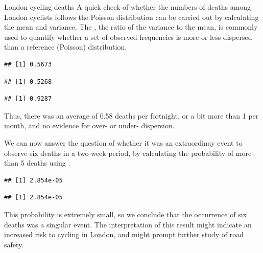 \documentclass[11pt]{book}
\renewenvironment{knitrout}{\small\renewcommand{\baselinestretch}{.85}}{} %
\begin{document}
\begin{Example}[cyclists2]{London cycling deaths}
A quick check of whether the numbers of deaths among London cyclists
follows the Poisson distribution
can be carried out by calculating the mean and variance.
The , the ratio of the variance to the mean,
is commonly used to quantify whether a set of observed frequencies 
is more or less dispersed than a reference (Poisson) distribution.
\begin{knitrout}
\color{fgcolor}\begin{kframe}
\begin{alltt}
 \hlkwb{<-} \hlopt{$}
\end{alltt}
\begin{verbatim}
## [1] 0.5673
\end{verbatim}
\begin{alltt}
 \hlkwb{<-} \hlopt{$}
\end{alltt}
\begin{verbatim}
## [1] 0.5268
\end{verbatim}
\begin{alltt}
\hlopt{/}
\end{alltt}
\begin{verbatim}
## [1] 0.9287
\end{verbatim}
\end{kframe}
\end{knitrout}
Thus, there was an average of 
0.58 deaths per fortnight,
or a bit more than 1 per month, and no evidence for over- or under-
dispersion.

We can now answer the question of whether it was an extraordinay
event to observe six deaths in a two-week period, by calculating
the probability of more than 5 deaths using .
\begin{knitrout}
\color{fgcolor}\begin{kframe}
\begin{alltt}
 \hlopt{-} \hlstd{(}
\end{alltt}
\begin{verbatim}
## [1] 2.854e-05
\end{verbatim}
\begin{alltt}
\hlstd{(} \hlstd{=}\hlstd{)}
\end{alltt}
\begin{verbatim}
## [1] 2.854e-05
\end{verbatim}
\end{kframe}
\end{knitrout}
This probability is extremely small, so we conclude that the
occurrence of six deaths was a singular event.
The interpretation of this result might indicate an increased
risk to cycling in London, and might prompt further study of
road safety.  
\end{Example}
\end{document}
